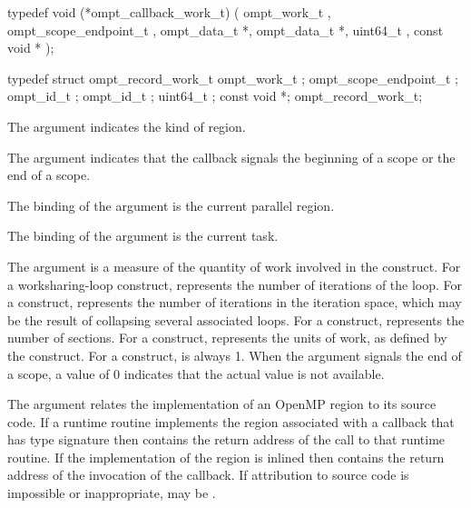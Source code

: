 \format
\begin{ccppspecific}
\begin{omptCallback}
typedef void (*ompt_callback_work_t) (
  ompt_work_t ,
  ompt_scope_endpoint_t ,
  ompt_data_t *,
  ompt_data_t *,
  uint64_t ,
  const void *
);
\end{omptCallback}
\end{ccppspecific}

\record
\begin{ccppspecific}
\begin{omptRecord}
typedef struct ompt_record_work_t {
  ompt_work_t ;
  ompt_scope_endpoint_t ;
  ompt_id_t ;
  ompt_id_t ;
  uint64_t ;
  const void *;
} ompt_record_work_t;
\end{omptRecord}
\end{ccppspecific}

\argdesc
The  argument indicates the kind of region.

The  argument indicates that the callback signals
the beginning of a scope or the end of a scope.

The binding of the  argument is the current parallel region.

The binding of the  argument is the current task.

The  argument is a measure of the quantity of work involved in 
the construct. For a worksharing-loop construct,  represents the 
number of iterations of the loop. For a  construct,  
represents the number of iterations in the iteration space, which may be the 
result of collapsing several associated loops. For a  construct, 
 represents the number of sections. For a  construct,
 represents the units of work, as defined by the  
construct. For a  construct,  is always 1. When the 
 argument signals the end of a scope, a  value of 0 
indicates that the actual  value is not available.

The  argument relates the implementation of an OpenMP region
to its source code. If a runtime routine implements the region associated with
a callback that has type signature  then
 contains the return address of the call to that runtime routine.
If the implementation of the region is inlined then  contains the
return address of the invocation of the callback. If attribution to source code
is impossible or inappropriate, may be .

